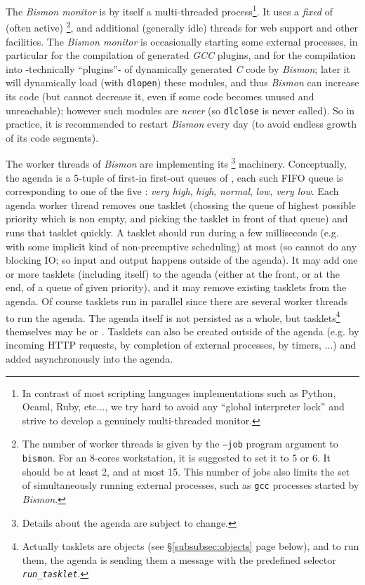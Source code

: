 The \textit{Bismon monitor} is by itself a multi-threaded
process\footnote{In contrast of most scripting languages
  implementations such as Python, Ocaml, Ruby, etc..., we try hard to
  avoid any ``global interpreter lock'' and strive to develop a
  genuinely multi-threaded monitor.}.
It uses a \emph{fixed} {} of
{} (often active)
\footnote{The number of worker threads is given by the \texttt{--job}
  program argument to \texttt{bismon}. For an 8-cores workstation, it
  is suggested to set it to 5 or 6. It should be at least 2, and at
  most 15. This number of jobs also limits the set of simultaneously
  running external processes, such as \texttt{gcc} processes started
  by \emph{Bismon}.}, and additional (generally idle) threads for web
support and other facilities. The \textit{Bismon monitor} is
occasionally starting some external processes, in particular for the
compilation of generated \emph{GCC} plugins, and for the compilation
into  -technically ``plugins''- of
dynamically generated \emph{C} code by \textit{Bismon}; later it will
dynamically load (with \texttt{dlopen}) these modules, and thus
\textit{Bismon} can increase its code (but cannot decrease it, even if
some code becomes unused and unreachable); however such modules are
\emph{never}  (so
\texttt{dlclose} is never called). So in practice, it is recommended
to restart \emph{Bismon} every day (to avoid endless growth of its
code segments).


The worker threads of \emph{Bismon} are implementing its
 \footnote{Details about the agenda are
  subject to change.} machinery. Conceptually, the agenda is a 5-tuple
of first-in first-out queues of ,
each such FIFO queue is corresponding to one of the five
 : \emph{very high}, \emph{high},
\emph{normal}, \emph{low}, \emph{very low}. Each agenda worker thread
removes one tasklet (chossing the queue of highest possible priority
which is non empty, and picking the tasklet in front of that queue)
and runs that tasklet quickly. A tasklet should run during a few
milliseconds (e.g. with some implicit kind of non-preemptive
scheduling) at most (so cannot do any blocking IO; so input and output
happens outside of the agenda). It may add one or more tasklets
(including itself) to the agenda (either at the front, or at the end,
of a queue of given priority), and it may remove existing tasklets
from the agenda. Of course tasklets run in parallel since there are
several worker threads to run the agenda. The agenda itself is not
persisted as a whole, but tasklets\footnote{Actually tasklets are
  objects (see §\ref{subsubsec:objects} page
  \pageref{subsubsec:objects} below), and to run them, the agenda is
  sending them a message with the predefined selector
  \texttt{\emph{run\_tasklet}}.}  themselves may be
 or .
Tasklets can also be created outside of the agenda (e.g. by incoming
HTTP requests, by completion of external processes, by timers, ...)
and added asynchronously into the agenda.

